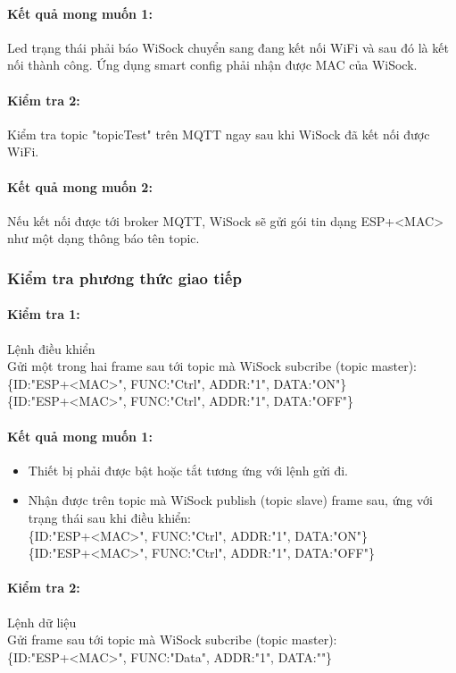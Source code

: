 \documentclass[a4paper]{article}
\begin{document}
\paragraph*{Kết quả mong muốn 1:}
Led trạng thái phải báo WiSock chuyển sang đang kết nối WiFi và sau đó là kết nối thành công. Ứng dụng smart config phải nhận được MAC của WiSock.
\paragraph*{Kiểm tra 2:}
Kiểm tra topic "topicTest" trên MQTT ngay sau khi WiSock đã kết nối được WiFi.
\paragraph*{Kết quả mong muốn 2:}
Nếu kết nối được tới broker MQTT, WiSock sẽ gửi gói tin dạng ESP+<MAC> như một dạng thông báo tên topic.
\subsubsection{Kiểm tra phương thức giao tiếp}
\paragraph*{Kiểm tra 1:} Lệnh điều khiển\\
Gửi một trong hai frame sau tới topic mà WiSock subcribe (topic master):\\
\{ID:"ESP+<MAC>", FUNC:"Ctrl", ADDR:"1", DATA:"ON"\}\\
\{ID:"ESP+<MAC>", FUNC:"Ctrl", ADDR:"1", DATA:"OFF"\}
\paragraph*{Kết quả mong muốn 1:}
\begin{itemize}
	\item Thiết bị phải được bật hoặc tắt tương ứng với lệnh gửi đi.
	\item Nhận được trên topic mà WiSock publish (topic slave) frame sau, ứng với trạng thái sau khi điều khiển:\\
	\{ID:"ESP+<MAC>", FUNC:"Ctrl", ADDR:"1", DATA:"ON"\}\\
	\{ID:"ESP+<MAC>", FUNC:"Ctrl", ADDR:"1", DATA:"OFF"\}
\end{itemize}
\paragraph*{Kiểm tra 2:} Lệnh dữ liệu\\
Gửi frame sau tới topic mà WiSock subcribe (topic master):\\
\{ID:"ESP+<MAC>", FUNC:"Data", ADDR:"1", DATA:""\}
\end{document}
